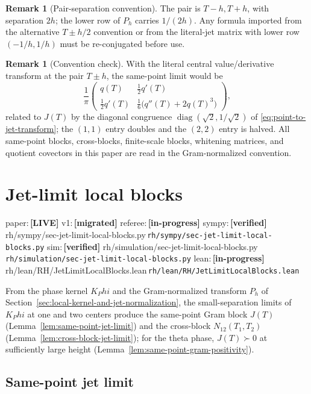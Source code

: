 \documentclass[11pt,a4paper]{amsart}
\def\Phi{Phi}%
\numberwithin{equation}{section}
\theoremstyle{plain}
\theoremstyle{definition}
\newtheorem{remark}[theorem]{Remark}
\newcommand{\Ph}{\Phi}
\newcommand{\diag}{\operatorname{diag}}
\newcommand{\status}[1]{\textbf{\scriptsize[#1]}}
\newcommand{\statuspaper}[1]{\textsf{\footnotesize paper:}\,\status{#1}}
\newcommand{\statusmig}[1]{\textsf{\footnotesize v1:}\,\status{#1}}
\newcommand{\statusreferee}[1]{\textsf{\footnotesize referee:}\,\status{#1}}
\newcommand{\statussympy}[2][\relax]{%
  \textsf{\footnotesize sympy:}\,\status{#2}%
  \ifx\relax#1\else\,\textsf{\scriptsize\texttt{#1}}\fi%
}
\newcommand{\statussim}[2][\relax]{%
  \textsf{\footnotesize sim:}\,\status{#2}%
  \ifx\relax#1\else\,\textsf{\scriptsize\texttt{#1}}\fi%
}
\newcommand{\statuslean}[2][\relax]{%
  \textsf{\footnotesize lean:}\,\status{#2}%
  \ifx\relax#1\else\,\textsf{\scriptsize\texttt{#1}}\fi%
}
\begin{document}
\begin{remark}[Pair-separation convention]
\label{rem:pair-separation-convention}
The pair is \(T-h, T+h\), with separation \(2h\); the lower row of
\(P_h\) carries \(1/(2h)\).  Any formula imported from the alternative
\(T\pm h/2\) convention or from the literal-jet matrix with lower row
\((-1/h, 1/h)\) must be re-conjugated before use.
\end{remark}

\begin{remark}[Convention check]
\label{rem:normalization-audit}
With the literal central value/derivative transform at the pair
\(T\pm h\), the same-point limit would be
\[
\frac1\pi
\begin{pmatrix}
q(T) & \tfrac12 q'(T)\\[0.6ex]
\tfrac12 q'(T) & \tfrac16\bigl(q''(T)+2q(T)^3\bigr)
\end{pmatrix},
\]
related to \(J(T)\) by the diagonal congruence
\(\diag(\sqrt 2, 1/\sqrt 2)\) of \eqref{eq:point-to-jet-transform}; the
\((1,1)\) entry doubles and the \((2,2)\) entry is halved.  All
same-point blocks, cross-blocks, finite-scale blocks, whitening
matrices, and quotient covectors in this paper are read in the
Gram-normalized convention.
\end{remark}

\section{Jet-limit local blocks}
\label{sec:jet-limit-local-blocks}
\statuspaper{LIVE}\quad
\statusmig{migrated}\quad
\statusreferee{in-progress}\quad
\statussympy[rh/sympy/sec-jet-limit-local-blocks.py]{verified}\quad
\statussim[rh/simulation/sec-jet-limit-local-blocks.py]{verified}\quad
\statuslean[rh/lean/RH/JetLimitLocalBlocks.lean]{in-progress}
\par\medskip

From the phase kernel \(K_\Ph\) and the Gram-normalized transform
\(P_h\) of Section~\ref{sec:local-kernel-and-jet-normalization}, the
small-separation limits of \(K_\Ph\) at one and two centers produce
the same-point Gram block \(J(T)\)
(Lemma~\ref{lem:same-point-jet-limit}) and the cross-block
\(N_{12}(T_1,T_2)\) (Lemma~\ref{lem:cross-block-jet-limit}); for the
theta phase, \(J(T)\succ 0\) at sufficiently large height
(Lemma~\ref{lem:same-point-gram-positivity}).

\subsection{Same-point jet limit}
\label{subsec:same-point-jet-limit}
\end{document}
